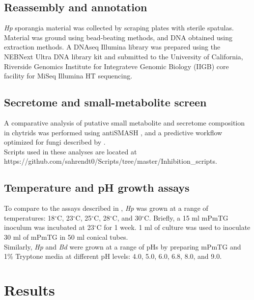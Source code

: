 \subsection{Reassembly and annotation}
\textit{Hp} sporangia material was collected by scraping plates with sterile spatulas. Material was ground using bead-beating methods, and DNA obtained using extraction methods. A DNAseq Illumina library was prepared using the NEBNext Ultra DNA library kit and submitted to the University of California, Riverside Genomics Institute for Integrateve Genomic Biology (IIGB) core facility for MiSeq Illumina HT sequencing.\\
\subsection{Secretome and small-metabolite screen}
A comparative analysis of putative small metabolite and secretome composition in chytrids was performed using antiSMASH \cite{Blin2013}, and a predictive workflow optimized for fungi described by \cite{Min2010}.\\
\indent Scripts used in these analyses are located at https://github.com/sahrendt0/Scripts/tree/master/Inhibition\_scripts.\\
\subsection{Temperature and pH growth assays}
To compare to the assays described in \cite{Piotrowski2004}, \textit{Hp} was grown at a range of temperatures: 18$^{\circ}$C, 23$^{\circ}$C, 25$^{\circ}$C, 28$^{\circ}$C, and 30$^{\circ}$C. Briefly, a 15 ml mPmTG inoculum was incubated at 23$^{\circ}$C for 1 week. 1 ml of culture was used to inoculate 30 ml of mPmTG in 50 ml conical tubes. \\
\indent Similarly, \textit{Hp} and \textit{Bd} were grown at a range of pHs by preparing mPmTG and 1\% Tryptone media at different pH levels: 4.0, 5.0, 6.0, 6.8, 8.0, and 9.0.\\
\section{Results}
